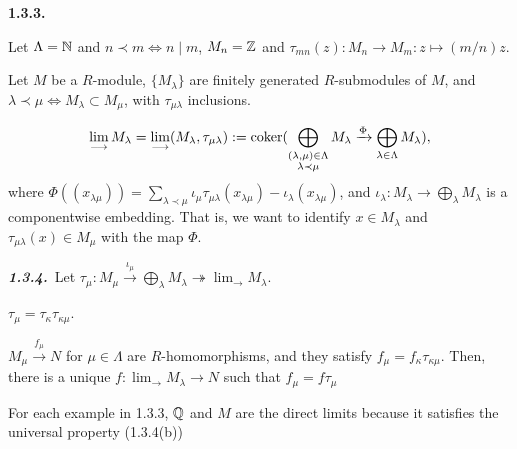 \documentclass{../../small}
\begin{document}
\begin{ex*}\hspace{-5pt}\textbf{1.3.3.}\,
\begin{parts}
\item Let $\Lambda=\mathbb{N}$ and $n\prec m\Leftrightarrow n\mid m$, $M_n=\mathbb{Z}$ and $\tau_{mn}(z):M_n\to M_m:z\mapsto(m/n)z$.
\item Let $M$ be a $R$-module, $\{M_\lambda\}$ are finitely generated $R$-submodules of $M$, and $\lambda\prec\mu\Leftrightarrow M_\lambda\subset M_\mu$, with $\tau_{\mu\lambda}$ inclusions.
\end{parts}
\end{ex*}

\begin{defn*}
\[\lim_{\longrightarrow}M_\lambda=\lim_{\longrightarrow}(M_\lambda,\tau_{\mu\lambda}):=\operatorname{coker}(\bigoplus_{\substack{(\lambda,\mu)\in\Lambda\\\lambda\prec\mu}} M_\lambda\xrightarrow{\Phi}\bigoplus_{\lambda\in\Lambda}M_{\lambda}),\]
where $\Phi((x_{\lambda\mu}))=\sum_{\lambda\prec\mu}\iota_\mu\tau_{\mu\lambda}(x_{\lambda\mu})-\iota_\lambda(x_{\lambda\mu})$, and $\iota_\lambda:M_\lambda\to\bigoplus_\lambda M_\lambda$ is a componentwise embedding.
That is, we want to identify $x\in M_\lambda$ and $\tau_{\mu\lambda}(x)\in M_\mu$ with the map $\Phi$.
\end{defn*}
\begin{prop*}\hspace{-5pt}\emph{\textbf{1.3.4.}}\,
Let $\tau_\mu:M_\mu\xrightarrow{\iota_\mu}\bigoplus_\lambda M_\lambda\twoheadrightarrow\lim_{\longrightarrow}M_\lambda$.
\begin{parts}
\item $\tau_\mu=\tau_\kappa\tau_{\kappa\mu}$.
\item $M_\mu\xrightarrow{f_\mu} N$ for $\mu\in\Lambda$ are $R$-homomorphisms, and they satisfy $f_\mu=f_\kappa\tau_{\kappa\mu}$. Then, there is a unique $f:\lim_{\longrightarrow}M_\lambda\to N$ such that $f_\mu=f\tau_\mu$
\end{parts}
\end{prop*}

For each example in 1.3.3, $\mathbb{Q}$ and $M$ are the direct limits because it satisfies the universal property (1.3.4(b))
\end{document}
